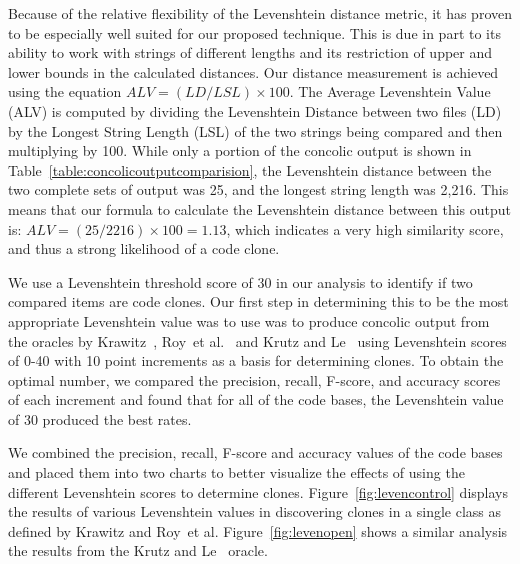 \documentclass{sig-alternate}
\begin{document}
Because of the relative flexibility of the Levenshtein distance metric, it has proven to be especially well suited for our proposed technique. This is due in part to its ability to work with strings of different lengths and its restriction of upper and lower bounds in the calculated distances. Our distance measurement is achieved using the equation $ALV = (LD/LSL) \times 100$. The Average Levenshtein Value (ALV) is computed by dividing the Levenshtein Distance between two files (LD) by the Longest String Length (LSL) of the two strings being compared and then multiplying by 100. While only a portion of the concolic output is shown in Table~\ref{table:concolicoutputcomparision}, the Levenshtein distance between the two complete sets of output was 25, and the longest string length was 2,216. This means that our formula to calculate the Levenshtein distance between this output is: $ALV = (25/2216) \times 100 = 1.13$, which indicates a very high similarity score, and thus a strong likelihood of a code clone.


We use a Levenshtein threshold score of 30 in our analysis to identify if two compared items are code clones. Our first step in determining this to be the most appropriate Levenshtein value was to use was to produce concolic output from the oracles by Krawitz~\cite{Kraw2012}, Roy~et al.~\cite{Roy:2009:CEC:1530898.1531101} and Krutz and Le~\cite{Krutz:2014:CCO:2597073.2597127} using Levenshtein scores of 0-40 with 10 point increments as a basis for determining clones. To obtain the optimal number, we compared the precision, recall, F-score, and accuracy scores of each increment and found that for all of the code bases, the Levenshtein value of 30 produced the best rates.

We combined the precision, recall, F-score and accuracy values of the code bases and placed them into two charts to better visualize the effects of using the different Levenshtein scores to determine clones. Figure~\ref{fig:levencontrol} displays the results of various Levenshtein values in discovering clones in a single class as defined by Krawitz and Roy~et al. Figure~\ref{fig:levenopen} shows a similar analysis the results from the Krutz and Le~\cite{Krutz:2014:CCO:2597073.2597127} oracle.

\end{document}
